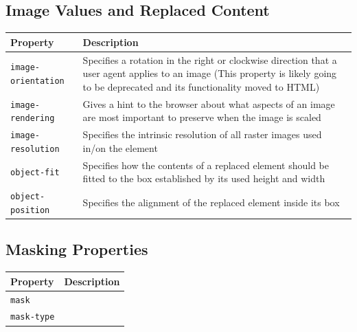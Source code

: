 \documentclass[11pt, letterpaper]{article}
\begin{document}
		\subsection{Image Values and Replaced Content}
			\begin{longtable}{p{5cm} p{10cm}}
				\toprule
				Property & Description \\\midrule 
				\texttt{image-orientation} & Specifies a rotation in the right or clockwise direction that a user agent applies to an image (This property is likely going to be deprecated and its functionality moved to HTML) \\\midrule
				\texttt{image-rendering} & Gives a hint to the browser about what aspects of an image are most important to preserve when the image is scaled \\\midrule
				\texttt{image-resolution} & Specifies the intrinsic resolution of all raster images used in/on the element \\\midrule
				\texttt{object-fit} & Specifies how the contents of a replaced element should be fitted to the box established by its used height and width \\\midrule
				\texttt{object-position} & Specifies the alignment of the replaced element inside its box \\\midrule
			\end{longtable}

		\subsection{Masking Properties}
			\begin{longtable}{p{5cm} p{10cm}}
				\toprule
				Property & Description \\\midrule 
				\texttt{mask} &  \\\midrule
				\texttt{mask-type} &  \\\midrule
			\end{longtable}
\end{document}
